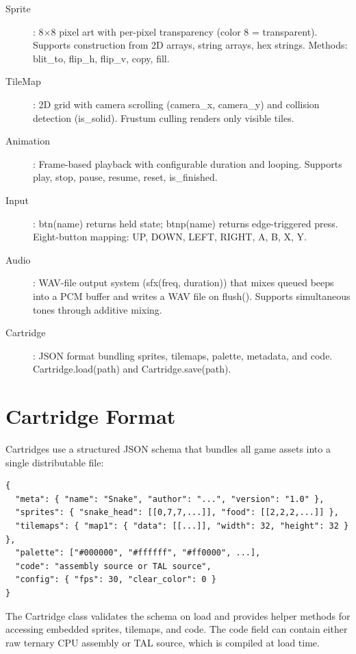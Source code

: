 \documentclass[12pt,a4paper,twoside]{book}
\theoremstyle{trinarytheorem}
\theoremstyle{trinarydefinition}
\newcommand{\code}[1]{\textsf{#1}}
\begin{document}
\begin{description}
    \item[\code{Sprite}]: 8$\times$8 pixel art with per-pixel transparency
          (color 8 = transparent). Supports construction from 2D arrays, string
          arrays, hex strings. Methods: \code{blit\_to}, \code{flip\_h},
          \code{flip\_v}, \code{copy}, \code{fill}.
    \item[\code{TileMap}]: 2D grid with camera scrolling (\code{camera\_x},
          \code{camera\_y}) and collision detection (\code{is\_solid}).
          Frustum culling renders only visible tiles.
    \item[\code{Animation}]: Frame-based playback with configurable duration and
          looping. Supports \code{play}, \code{stop}, \code{pause},
          \code{resume}, \code{reset}, \code{is\_finished}.
    \item[\code{Input}]: \code{btn(name)} returns held state; \code{btnp(name)}
          returns edge-triggered press. Eight-button mapping: UP, DOWN, LEFT, RIGHT,
          A, B, X, Y.
    \item[\code{Audio}]: WAV-file output system (\code{sfx(freq, duration)}) that
          mixes queued beeps into a PCM buffer and writes a WAV file on \code{flush()}.
          Supports simultaneous tones through additive mixing.
    \item[\code{Cartridge}]: JSON format bundling sprites, tilemaps, palette,
          metadata, and code. \code{Cartridge.load(path)} and
          \code{Cartridge.save(path)}.
\end{description}

\section{Cartridge Format}

Cartridges use a structured JSON schema that bundles all game assets into a
single distributable file:

\begin{verbatim}
{
  "meta": { "name": "Snake", "author": "...", "version": "1.0" },
  "sprites": { "snake_head": [[0,7,7,...]], "food": [[2,2,2,...]] },
  "tilemaps": { "map1": { "data": [[...]], "width": 32, "height": 32 } },
  "palette": ["#000000", "#ffffff", "#ff0000", ...],
  "code": "assembly source or TAL source",
  "config": { "fps": 30, "clear_color": 0 }
}
\end{verbatim}

The \code{Cartridge} class validates the schema on load and provides helper
methods for accessing embedded sprites, tilemaps, and code. The code field
can contain either raw ternary CPU assembly or TAL source, which is compiled
at load time.
\end{document}
